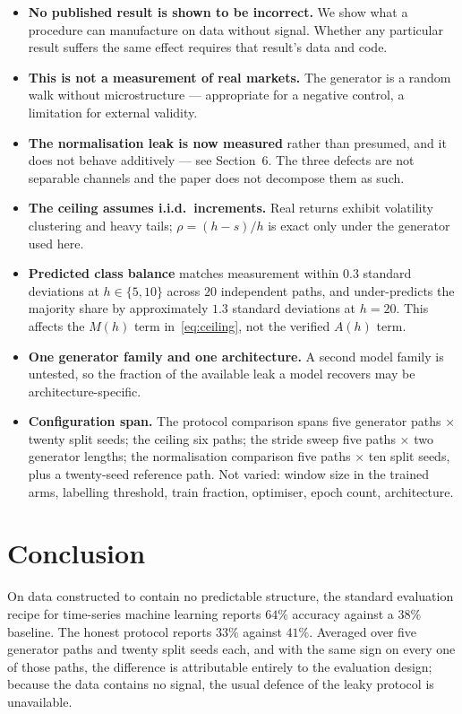 \documentclass[11pt,a4paper]{article}
\begin{document}
\begin{itemize}
\item \textbf{No published result is shown to be incorrect.} We show what a
procedure can manufacture on data without signal. Whether any particular result
suffers the same effect requires that result's data and code.
\item \textbf{This is not a measurement of real markets.} The generator is a
random walk without microstructure --- appropriate for a negative control, a
limitation for external validity.
\item \textbf{The normalisation leak is now measured} rather than presumed, and
it does not behave additively --- see Section~6. The three defects are not
separable channels and the paper does not decompose them as such.
\item \textbf{The ceiling assumes i.i.d.\ increments.} Real returns exhibit
volatility clustering and heavy tails; $\rho = (h-s)/h$ is exact only under the
generator used here.
\item \textbf{Predicted class balance} matches measurement within $0.3$ standard
deviations at $h \in \{5,10\}$ across $20$ independent paths, and
under-predicts the majority share by approximately $1.3$ standard deviations at
$h=20$. This affects the $M(h)$ term in~\eqref{eq:ceiling}, not the verified
$A(h)$ term.
\item \textbf{One generator family and one architecture.} A second model family
is untested, so the fraction of the available leak a model recovers may be
architecture-specific.
\item \textbf{Configuration span.} The protocol comparison spans five generator
paths $\times$ twenty split seeds; the ceiling six paths; the stride sweep five
paths $\times$ two generator lengths; the normalisation comparison five paths
$\times$ ten split seeds, plus a twenty-seed reference path. Not varied: window
size in the trained arms, labelling threshold, train fraction, optimiser, epoch
count, architecture.
\end{itemize}

\section{Conclusion}

On data constructed to contain no predictable structure, the standard evaluation
recipe for time-series machine learning reports $64\%$ accuracy against a
$38\%$ baseline. The honest protocol reports $33\%$ against
$41\%$. Averaged over five generator paths and twenty split seeds each,
and with the same sign on every one of those paths, the difference is attributable
entirely to the evaluation design; because the data contains no signal, the usual
defence of the leaky protocol is unavailable.
\end{document}
